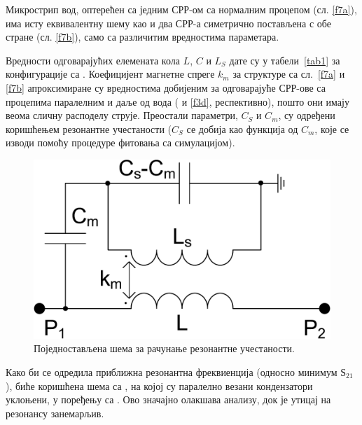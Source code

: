 Микрострип вод, оптерећен са једним СРР-ом са нормалним процепом (сл. \ref{f7a}), има исту еквивалентну шему као и два СРР-а симетрично постављена с обе стране (сл. \ref{f7b}), само са различитим вредностима параметара.

Вредности одговарајућих елемената кола $L$, $C$ и $L_S$ дате су у табели~\ref{tab1} за конфигурације са . Коефицијент магнетне спреге $k_m$ за структуре са сл.~\ref{f7a} и \ref{f7b} апроксимиране су вредностима добијеним за одговарајуће СРР-ове са процепима паралелним и даље од вода ( и \ref{f3d}, респективно), пошто они имају веома сличну расподелу струје. Преостали параметри, $C_S$ и $C_m$, су одређени коришћењем резонантне учестаности ($C_S$ се добија као функција од $C_m$, које се изводи помоћу процедуре фитовања са симулацијом).

\begin{figure}[!t]
\centering
\includegraphics[width=0.4\columnwidth]{sl_ekv/fig8}
\caption{Поједностављена шема за рачунање резонантне учестаности.}
\label{f8}
\end{figure}
Како би се одредила приближна резонантна фреквиенција (односно минимум $Ѕ_{21}$), биће коришћена шема са , на којој су паралелно везани кондензатори уклоњени, у поређењу са . Ово значајно олакшава анализу, док је утицај на резонансу занемарљив.

